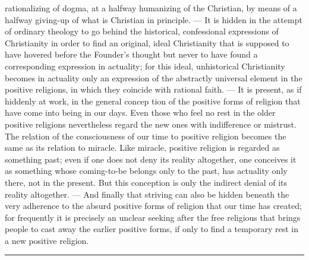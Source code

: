 \documentclass[12pt,a4paper,openany]{book}
\newcommand{\opage}[1]{\marginnote{\footnotesize\textit{[#1]}}}
\begin{document}
rationalizing of dogma, at a halfway humanizing
of the Christian, by means of a halfway giving-up of
what is Christian in principle. --- It is hidden in the attempt of ordinary
theology to go behind the historical, confessional
expressions of Christianity in order to find an original,
ideal Christianity that is supposed to have hovered before the Founder's thought
but never to have found a corresponding expression in actuality; for
this ideal, unhistorical Christianity becomes in actuality
only an expression of the abstractly universal element in the positive
religions, in which they coincide with rational faith. ---
It is present, as if hiddenly at work, in the general concep%
\opage{297}tion of the positive forms of religion that have come into being in
our days. Even those who feel no rest in the older positive
religions nevertheless regard the new ones with indifference or
mistrust. The relation of the consciousness of our time to positive
religion becomes the same as its relation to miracle.
Like miracle, positive religion is regarded as something
past; even if one does not deny its reality altogether,
one conceives it as something whose coming-to-be belongs only
to the past, has actuality only there, not in the present.
But this conception is only the indirect denial
of its reality altogether. --- And finally that
striving can also be hidden beneath the very adherence to the
absurd positive forms of religion that our time has created;
for frequently it is precisely an unclear seeking after the free
religious that brings people to cast away the earlier positive
forms, if only to find a temporary rest
in a new positive religion.

\begin{center}\rule{1.8cm}{0.4pt}\end{center}
\end{document}
